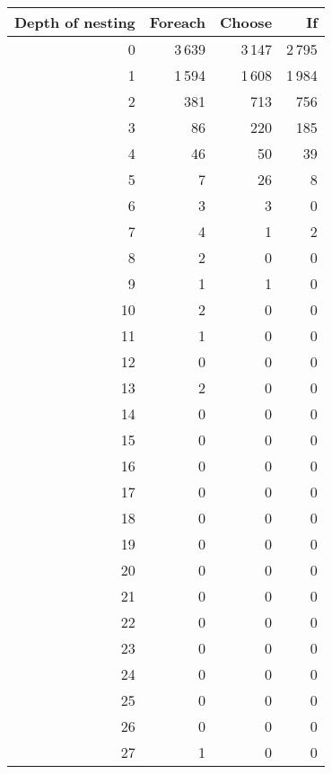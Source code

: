 \begin{tabular}{|r|r|r|r|}
\hline
\bf Depth of nesting&\bf Foreach&\bf Choose&\bf If\\
\hline
0&3\,639&3\,147&2\,795\\
\hline
1&1\,594&1\,608&1\,984\\
\hline
2&381&713&756\\
\hline
3&86&220&185\\
\hline
4&46&50&39\\
\hline
5&7&26&8\\
\hline
6&3&3&0\\
\hline
7&4&1&2\\
\hline
8&2&0&0\\
\hline
9&1&1&0\\
\hline
10&2&0&0\\
\hline
11&1&0&0\\
\hline
12&0&0&0\\
\hline
13&2&0&0\\
\hline
14&0&0&0\\
\hline
15&0&0&0\\
\hline
16&0&0&0\\
\hline
17&0&0&0\\
\hline
18&0&0&0\\
\hline
19&0&0&0\\
\hline
20&0&0&0\\
\hline
21&0&0&0\\
\hline
22&0&0&0\\
\hline
23&0&0&0\\
\hline
24&0&0&0\\
\hline
25&0&0&0\\
\hline
26&0&0&0\\
\hline
27&1&0&0\\
\hline
\end{tabular}

